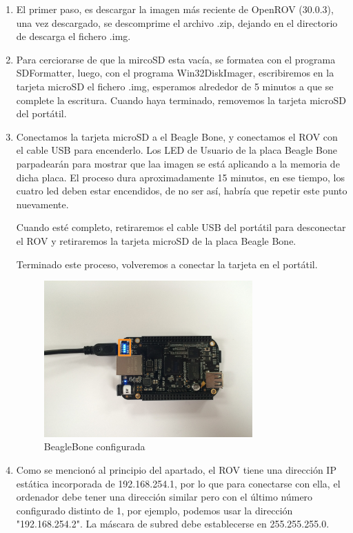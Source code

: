 \begin{enumerate}
\item El primer paso, es descargar la imagen más reciente de OpenROV (30.0.3), una vez descargado, se descomprime el archivo .zip, dejando en el directorio de descarga el fichero .img.
\item Para cerciorarse de que la mircoSD esta vacía, se formatea con el programa SDFormatter, luego, con el programa Win32DiskImager, escribiremos en la tarjeta microSD el fichero .img, esperamos alrededor de 5 minutos a que se complete la escritura. Cuando haya terminado, removemos la tarjeta microSD del portátil.
\item Conectamos  la tarjeta microSD a el Beagle Bone, y conectamos el ROV con el cable USB para encenderlo. Los LED de Usuario de la placa Beagle Bone parpadearán para mostrar que laa imagen se está aplicando a la memoria de dicha placa. El proceso dura aproximadamente 15 minutos, en ese tiempo, los cuatro led deben estar encendidos, de no ser así, habría que repetir este punto nuevamente.

Cuando esté completo, retiraremos el cable USB del portátil para desconectar el ROV y retiraremos la tarjeta microSD de la placa Beagle Bone.

Terminado este proceso, volveremos a conectar la tarjeta en el portátil.

\begin{figure} [hbtp]
\begin{center}
  \includegraphics[width=8cm]{img/cap3/3_4/BBB}
\end{center}
\caption{BeagleBone configurada}
\label{fig:bbb}
\end{figure}
\item Como se mencionó al principio del apartado, el ROV tiene una dirección IP estática incorporada de 192.168.254.1, por lo que para conectarse con ella, el ordenador debe tener una dirección similar pero con el último número configurado  distinto de 1, por ejemplo, podemos usar la dirección "192.168.254.2". La máscara de subred debe establecerse en 255.255.255.0.


\end{enumerate}
